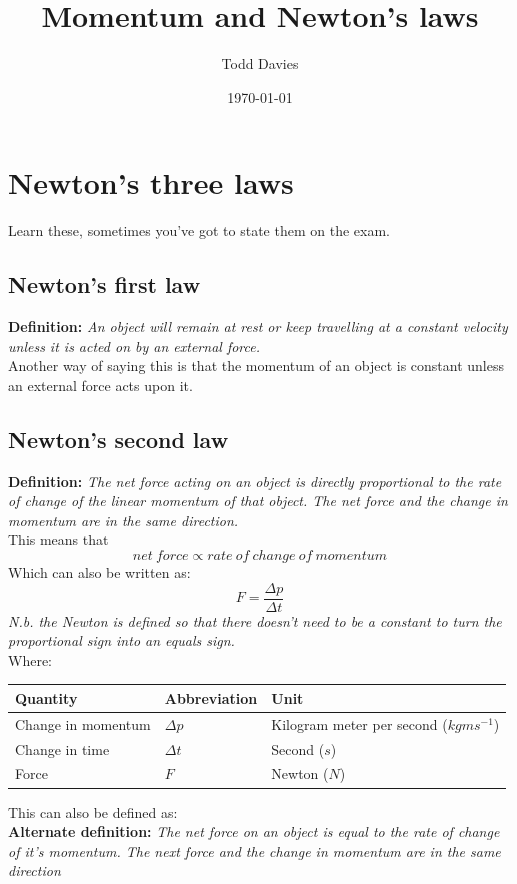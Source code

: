 \documentclass{article}
\title{Momentum and Newton's laws}
\author{Todd Davies}
\date{\today}
\begin{document}
\lhead{\today}
\setlength{\parindent}{0cm}

\maketitle

\section*{Newton's three laws}
\thispagestyle{empty}
\label{sec:NewtonSThreeLaws}
Learn these, sometimes you've got to state them on the exam.
\subsection*{Newton's first law}
\textbf{Definition:} \textit{An object will remain at rest or keep travelling at a constant velocity unless it is acted on by an external force.}\\
Another way of saying this is that the momentum of an object is constant unless an external force acts upon it.
\subsection*{Newton's second law}
\textbf{Definition:} \textit{The net force acting on an object is directly proportional to the rate of change of the linear momentum of that object. The net force and the change in momentum are in the same direction.}\\
This means that 
\[
	net\:force \propto rate\:of\:change\:of\:momentum
\]
Which can also be written as:
\[
	F = \frac{\Delta p}{\Delta t}
\]
\textit{N.b. the Newton is defined so that there doesn't need to be a constant to turn the proportional sign into an equals sign.}\\
Where:
\begin{center}
	\begin{tabular}{|l|l|l|}
		\hline
			Quantity & Abbreviation & Unit \\ \hline
			Change in momentum & $\Delta p$ & Kilogram meter per second ($kgms^{-1}$) \\ \hline
			Change in time & $\Delta t$ & Second ($s$) \\ \hline
			Force & $F$ & Newton ($N$) \\ \hline
	\end{tabular}
\end{center}
This can also be defined as:\\
\textbf{Alternate definition:} \textit{The net force on an object is equal to the rate of change of it's momentum. The next force and the change in momentum are in the same direction}
\end{document}
